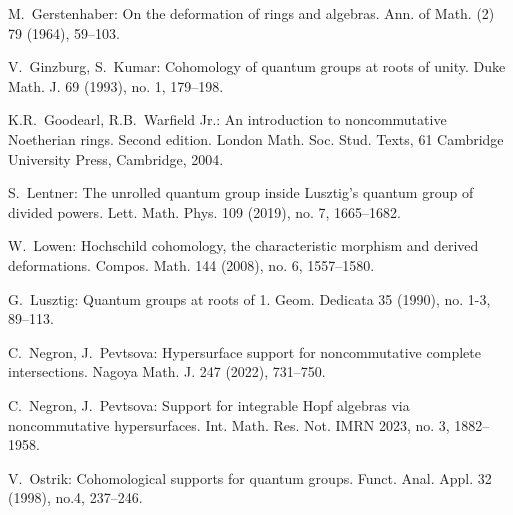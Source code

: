 \documentclass{amsart}
\numberwithin{equation}{section}
\theoremstyle{definition}
\theoremstyle{remark}
\begin{document}
\begin{thebibliography}
 M.~Gerstenhaber:
On the deformation of rings and algebras.
Ann. of Math. (2) 79 (1964), 59--103.

 V.~Ginzburg, S.~Kumar:
Cohomology of quantum groups at roots of unity.
Duke Math. J. 69 (1993), no. 1, 179--198.

 K.R.~Goodearl, R.B.~Warfield Jr.:
An introduction to noncommutative Noetherian rings.
Second edition.
London Math. Soc. Stud. Texts, 61
Cambridge University Press, Cambridge, 2004. 


 
  S.~Lentner:
The unrolled quantum group inside Lusztig's quantum group of divided powers.
Lett. Math. Phys. 109 (2019), no. 7, 1665--1682.
 
  W.~Lowen:
Hochschild cohomology, the characteristic morphism and derived deformations.
Compos. Math. 144 (2008), no. 6, 1557--1580.


 G.~Lusztig:
Quantum groups at roots of 1.
Geom. Dedicata 35 (1990), no. 1-3, 89--113.

C.~Negron, J.~Pevtsova:
Hypersurface support for noncommutative complete intersections.
Nagoya Math. J. 247 (2022), 731--750.


C.~Negron, J.~Pevtsova:
Support for integrable Hopf algebras via noncommutative hypersurfaces.
Int. Math. Res. Not. IMRN 2023, no. 3, 1882--1958.


 V.~Ostrik:
Cohomological supports for quantum groups.
Funct. Anal. Appl. 32 (1998), no.4, 237--246.

 	\end{thebibliography}
\end{document}
